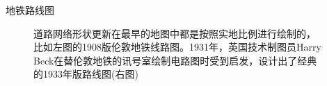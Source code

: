\documentclass{beamerthemeMono}
\begin{document}
\begin{frame}{\subsecname}{地铁路线图}
  
  \begin{figure}\centering
    \vspace{0.5pt} 
    \caption{道路网络形状更新在最早的地图中都是按照实地比例进行绘制的，
      比如左图的1908版伦敦地铁线路图。1931年，英国技术制图员Harry
      Beck在替伦敦地铁的讯号室绘制电路图时受到启发，设计出了经典
      的1933年版路线图(右图)}
  \end{figure}
  
\end{frame}
\end{document}
